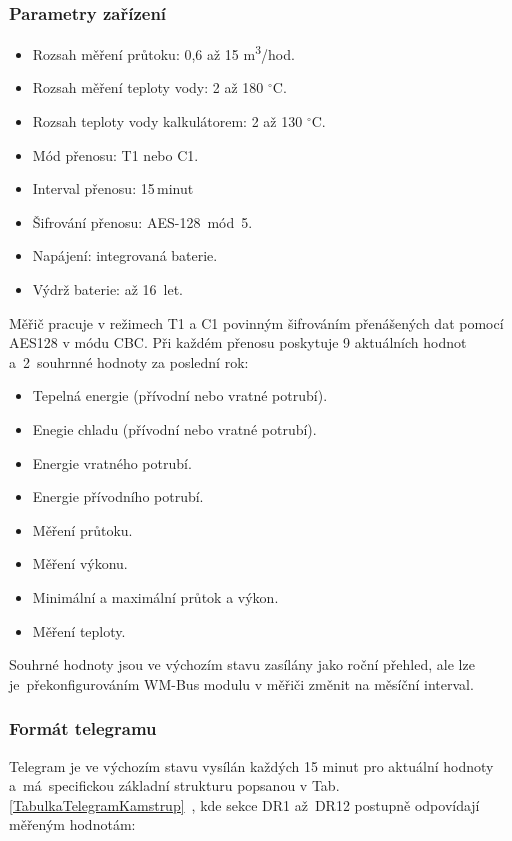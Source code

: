 		
\subsubsection{Parametry zařízení}
\begin{itemize}
	\item Rozsah měření průtoku: 0,6 až 15 m\textsuperscript{3}/hod.
	\item Rozsah měření teploty vody: 2 až 180 $^{\circ}$C.
	\item Rozsah teploty vody kalkulátorem: 2 až 130 $^{\circ}$C.
	\item Mód přenosu: T1 nebo C1.
	\item Interval přenosu: 15\,minut 
	\item Šifrování přenosu: AES-128~mód~5.
	\item Napájení: integrovaná baterie.
	\item Výdrž baterie: až 16~let.
\end{itemize}

\vspace{+10pt}	
	
Měřič pracuje v režimech T1 a C1  povinným šifrováním přenášených dat pomocí AES128 v módu CBC. Při každém přenosu poskytuje 9 aktuálních hodnot a~2~souhrnné hodnoty za poslední rok:

\begin{itemize}
	\item Tepelná energie (přívodní nebo vratné potrubí).
	\item Enegie chladu (přívodní nebo vratné potrubí).
	\item Energie vratného potrubí.
	\item Energie přívodního potrubí.
	\item Měření průtoku.
	\item Měření výkonu.
	\item Minimální a maximální průtok a výkon.
	\item Měření teploty.
\end{itemize}

\vspace{+10pt}	

Souhrné hodnoty jsou ve výchozím stavu zasílány jako roční přehled, ale lze je~překonfigurováním WM-Bus modulu v měřiči změnit na měsíční interval.

\subsubsection{Formát telegramu}
Telegram je ve výchozím stavu vysílán každých 15 minut pro aktuální hodnoty a~má~specifickou základní strukturu popsanou v Tab. \ref{TabulkaTelegramKamstrup}~\cite{CidloKamstrup}, kde sekce DR1 až~DR12 postupně odpovídají měřeným hodnotám:

